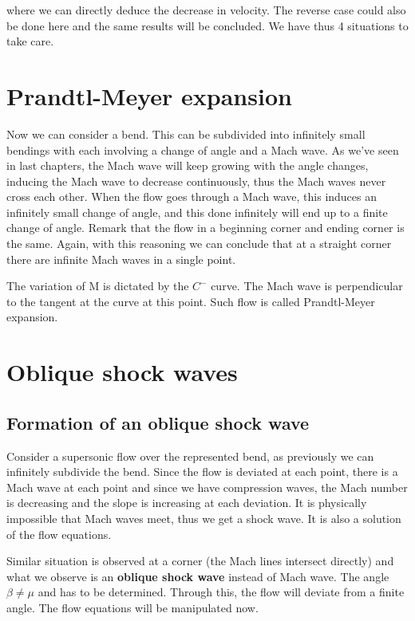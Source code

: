 	where we can directly deduce the decrease in velocity. The reverse case could also be done here and the same results will be concluded. We have thus 4 situations to take care. 
	
\section{Prandtl-Meyer expansion}
	Now we can consider a bend. This can be subdivided into infinitely small bendings with each involving a change of angle and a Mach wave. As we've seen in last chapters, the Mach wave will keep growing with the angle changes, inducing the Mach wave to decrease continuously, thus the Mach waves never cross each other. When the flow goes through a Mach wave, this induces an infinitely small change of angle, and this done infinitely will end up to a finite change of angle. Remark that the flow in a beginning corner and ending corner is the same.  Again, with this reasoning we can conclude that at a straight corner there are infinite Mach waves in a single point. 
	
	The variation of M is dictated by the $C^-$ curve. The Mach wave is perpendicular to the tangent at the curve at this point. Such flow is called Prandtl-Meyer expansion. 
	
\section{Oblique shock waves}
\subsection{Formation of an oblique shock wave}
	Consider a supersonic flow over the represented bend, as previously we can infinitely subdivide the bend. Since the flow is deviated at each point, there is a Mach wave at each point and since we have compression waves, the Mach number is decreasing and the slope is increasing at each deviation. It is physically impossible that Mach waves meet, thus we get a shock wave. It is also a solution of the flow equations. 
	
	Similar situation is observed at a corner (the Mach lines intersect directly) and what we observe is an \textbf{oblique shock wave} instead of Mach wave. The angle $\beta \neq \mu $ and has to be determined. Through this, the flow will deviate from a finite angle. The flow equations will be manipulated now. 
	\newpage
